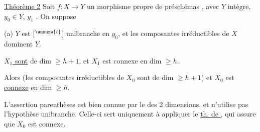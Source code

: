
\uline{Théorème 2} Soit $f:X\longrightarrow Y$ un
morphisme  propre de
préschémas  , avec $Y$ intègre,
$y_0\in Y$, $y_1$ 
.
On suppose

 (a) $Y$ est [$^{\unsure{t}}$] unibranche en $y_0$,
et les composantes irréductibles de
$X$ dominent $Y$.

 \uline{$X_1$ sont} de dim $\geq h+1$, et $X_1$ est
connexe en dim $\geq h$.

Alors (les composantes irréductibles
de $X_0$ sont de dim $\geq h+1$) et
$X_0$ est \uline{connexe} en dim $\geq h$.

L'assertion  parenthèses est
bien connue par le  des 2
dimensions, et n'utilise pas l'hypothèse
unibranche. Celle-ci sert uniquement
à appliquer le \uline{th. de },
qui assure que $X_0$ est connexe.

